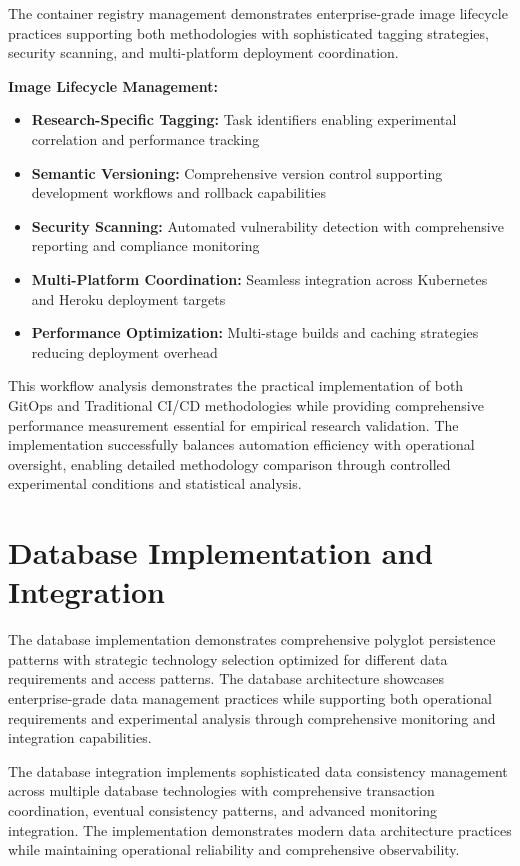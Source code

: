 The container registry management demonstrates enterprise-grade image lifecycle practices supporting both methodologies with sophisticated tagging strategies, security scanning, and multi-platform deployment coordination.



\textbf{Image Lifecycle Management:}
\begin{itemize}
\item \textbf{Research-Specific Tagging:} Task identifiers enabling experimental correlation and performance tracking
\item \textbf{Semantic Versioning:} Comprehensive version control supporting development workflows and rollback capabilities
\item \textbf{Security Scanning:} Automated vulnerability detection with comprehensive reporting and compliance monitoring
\item \textbf{Multi-Platform Coordination:} Seamless integration across Kubernetes and Heroku deployment targets
\item \textbf{Performance Optimization:} Multi-stage builds and caching strategies reducing deployment overhead
\end{itemize}

This workflow analysis demonstrates the practical implementation of both GitOps and Traditional CI/CD methodologies while providing comprehensive performance measurement essential for empirical research validation. The implementation successfully balances automation efficiency with operational oversight, enabling detailed methodology comparison through controlled experimental conditions and statistical analysis.

\section{Database Implementation and Integration}

The database implementation demonstrates comprehensive polyglot persistence patterns with strategic technology selection optimized for different data requirements and access patterns. The database architecture showcases enterprise-grade data management practices while supporting both operational requirements and experimental analysis through comprehensive monitoring and integration capabilities.

The database integration implements sophisticated data consistency management across multiple database technologies with comprehensive transaction coordination, eventual consistency patterns, and advanced monitoring integration. The implementation demonstrates modern data architecture practices while maintaining operational reliability and comprehensive observability.


